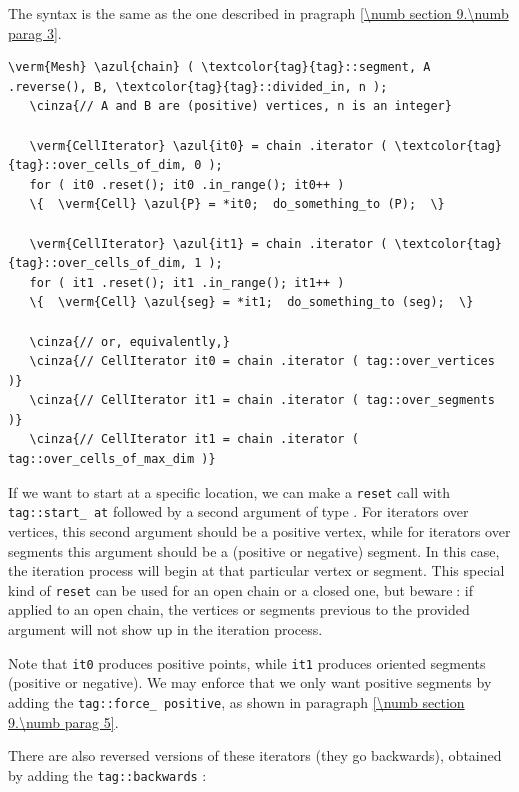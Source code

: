The syntax is the same as the one described in pragraph \ref{\numb section 9.\numb parag 3}.

\begin{Verbatim}[commandchars=\\\{\},formatcom=\small\tt,
   baselinestretch=0.94,framesep=2mm                      ]
   \verm{Mesh} \azul{chain} ( \textcolor{tag}{tag}::segment, A .reverse(), B, \textcolor{tag}{tag}::divided_in, n );
   \cinza{// A and B are (positive) vertices, n is an integer}
   
   \verm{CellIterator} \azul{it0} = chain .iterator ( \textcolor{tag}{tag}::over_cells_of_dim, 0 );
   for ( it0 .reset(); it0 .in_range(); it0++ )
   \{  \verm{Cell} \azul{P} = *it0;  do_something_to (P);  \}

   \verm{CellIterator} \azul{it1} = chain .iterator ( \textcolor{tag}{tag}::over_cells_of_dim, 1 );
   for ( it1 .reset(); it1 .in_range(); it1++ )
   \{  \verm{Cell} \azul{seg} = *it1;  do_something_to (seg);  \}
   
   \cinza{// or, equivalently,}
   \cinza{// CellIterator it0 = chain .iterator ( tag::over_vertices )}
   \cinza{// CellIterator it1 = chain .iterator ( tag::over_segments )}
   \cinza{// CellIterator it1 = chain .iterator ( tag::over_cells_of_max_dim )}
\end{Verbatim}

If we want to start at a specific location, we can make a {\small\tt reset} call with
{\small\tt \textcolor{tag}{tag}::start\_\,at} followed by a second argument of type {\small\tt{}}.
For iterators over vertices, this second argument should be a positive vertex,
while for iterators over segments this argument should be a (positive or negative) segment.
In this case, the iteration process will begin at that particular vertex or segment.
This special kind of {\small\tt reset} can be used for an open chain or a closed one,
but beware$\;$: if applied to an open chain, the vertices or segments previous to the provided
argument will not show up in the iteration process.

Note that {\small\tt it0} produces positive points, while {\small\tt  it1} produces
oriented segments (positive or negative).
We may enforce that we only want positive segments by adding the
{\small\tt \textcolor{tag}{tag}::force\_\,positive}, as shown in paragraph \ref{\numb section 9.\numb parag 5}.

There are also reversed versions of these iterators (they go backwards), obtained by adding
the {\small\tt \textcolor{tag}{tag}::backwards} :

